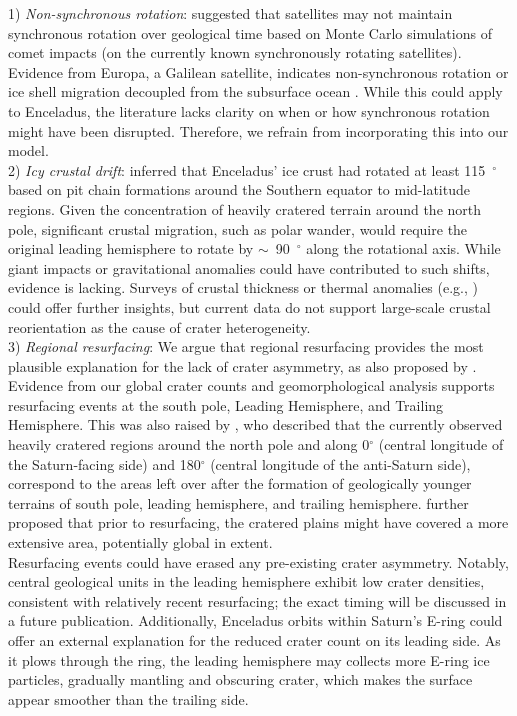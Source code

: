 \documentclass[preprint,11pt,3p,times,authoryear]{elsarticle}
\begin{document}
{1) \textit{Non-synchronous rotation}: \citet{Zahnle2001} suggested that satellites may not maintain synchronous rotation over geological time based on Monte Carlo simulations of comet impacts (on the currently known synchronously rotating satellites). Evidence from Europa, a Galilean satellite, indicates non-synchronous rotation or ice shell migration decoupled from the subsurface ocean \citep{Kattenhorn2009,Collins2009}. While this could apply to Enceladus, the literature lacks clarity on when or how synchronous rotation might have been disrupted. Therefore, we refrain from incorporating this into our model.\\

2) \textit{Icy crustal drift}: \citet{Martin2014} inferred that Enceladus' ice crust had rotated at least 115~$^\circ$ based on pit chain formations around the Southern equator to mid-latitude regions. Given the concentration of heavily cratered terrain around the north pole, significant crustal migration, such as polar wander, would require the original leading hemisphere to rotate by $\sim$~90~$^\circ$ along the rotational axis. While giant impacts or gravitational anomalies could have contributed to such shifts, evidence is lacking. Surveys of crustal thickness or thermal anomalies (e.g., \citealt{Schenk2024}) could offer further insights, but current data do not support large-scale crustal reorientation as the cause of crater heterogeneity.\\

3) \textit{Regional resurfacing}: We argue that regional resurfacing provides the most plausible explanation for the lack of crater asymmetry, as also proposed by \citet{Zahnle2001}.
Evidence from our global crater counts and geomorphological analysis supports resurfacing events at the south pole, Leading Hemisphere, and Trailing Hemisphere. This was also raised by \citet{Patterson2018}, who described that the currently observed heavily cratered regions around the north pole and along 0$^\circ$ (central longitude of the Saturn-facing side) and 180$^\circ$ (central longitude of the anti-Saturn side), correspond to the areas left over after the formation of geologically younger terrains of south pole, leading hemisphere, and trailing hemisphere. \citet{Patterson2018} further proposed that prior to resurfacing, the cratered plains might have covered a more extensive area, potentially global in extent.\\

Resurfacing events could have erased any pre-existing crater asymmetry. Notably, central geological units in the leading hemisphere exhibit low crater densities, consistent with relatively recent resurfacing; the exact timing will be discussed in a future publication. Additionally, Enceladus orbits within Saturn's E-ring could offer an external explanation for the reduced crater count on its leading side. As it plows through the ring, the leading hemisphere may collects more E-ring ice particles, gradually mantling and obscuring crater, which makes the surface appear smoother than the trailing side.\\

}
\end{document}
